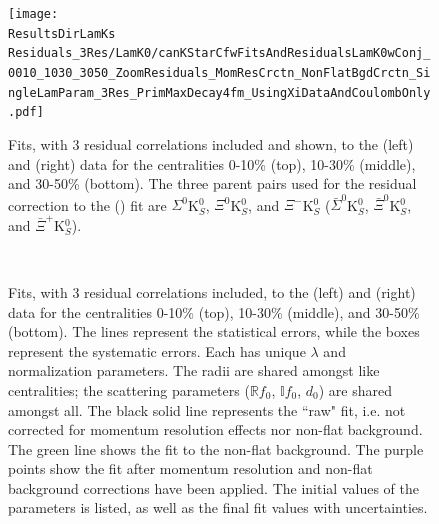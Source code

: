 \documentclass[../AnalysisNoteJBuxton.tex]{subfiles}
\begin{document}
\begin{figure}[h]
  \centering
  \texttt{[image: \\ResultsDirLamKs Residuals\_3Res/LamK0/canKStarCfwFitsAndResidualsLamK0wConj\_0010\_1030\_3050\_ZoomResiduals\_MomResCrctn\_NonFlatBgdCrctn\_SingleLamParam\_3Res\_PrimMaxDecay4fm\_UsingXiDataAndCoulombOnly.pdf]}
  \caption[\LamALamKs Fits showing 3 Residuals]{Fits, with 3 residual correlations included and shown, to the \LamKs (left) and \ALamKs (right) data for the centralities 0-10\% (top), 10-30\% (middle), and 30-50\% (bottom).  The three parent pairs used for the residual correction to the \LamKs (\ALamKs) fit are $\Sigma^{0}$K$^{0}_{S}$, $\Xi^{0}$K$^{0}_{S}$, and $\Xi^{-}$K$^{0}_{S}$ ($\bar{\Sigma}^{0}$K$^{0}_{S}$, $\bar{\Xi}^{0}$K$^{0}_{S}$, and $\bar{\Xi}^{+}$K$^{0}_{S}$).}
  \label{fig:LamK0wConjFitsAndResiduals_3Res}
\end{figure}






\begin{figure}[h!]
  \centering
  \\  
  \caption[\LamKchPALamKchM Fits with 3 Residuals]{Fits, with 3 residual correlations included, to the \LamKchP (left) and \ALamKchM (right) data for the centralities 0-10\% (top), 10-30\% (middle), and 30-50\% (bottom).
The lines represent the statistical errors, while the boxes represent the systematic errors.  
Each has unique $\lambda$ and normalization parameters.
The radii are shared amongst like centralities; the scattering parameters ($\mathbb{R}f_{0}$, $\mathbb{I}f_{0}$, $d_{0}$) are shared amongst all.
The black solid line represents the ``raw" fit, i.e. not corrected for momentum resolution effects nor non-flat background.  
The green line shows the fit to the non-flat background.
The purple points show the fit after momentum resolution and non-flat background corrections have been applied.
The initial values of the parameters is listed, as well as the final fit values with uncertainties.}
  \label{fig:LamKchPwConjFits_3Res}
\end{figure}
\end{document}
